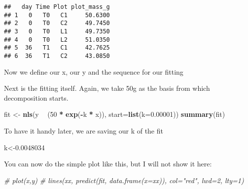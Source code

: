 \documentclass[
]{article}
\newenvironment{Shaded}{\begin{snugshade}}{\end{snugshade}}
\newcommand{\CommentTok}[1]{\textcolor[rgb]{0.56,0.35,0.01}{\textit{#1}}}
\newcommand{\DataTypeTok}[1]{\textcolor[rgb]{0.13,0.29,0.53}{#1}}
\newcommand{\DecValTok}[1]{\textcolor[rgb]{0.00,0.00,0.81}{#1}}
\newcommand{\FloatTok}[1]{\textcolor[rgb]{0.00,0.00,0.81}{#1}}
\newcommand{\KeywordTok}[1]{\textcolor[rgb]{0.13,0.29,0.53}{\textbf{#1}}}
\newcommand{\NormalTok}[1]{#1}
\newcommand{\OperatorTok}[1]{\textcolor[rgb]{0.81,0.36,0.00}{\textbf{#1}}}
\newcommand{\StringTok}[1]{\textcolor[rgb]{0.31,0.60,0.02}{#1}}
\begin{document}
\begin{verbatim}
##   day Time Plot plot_mass_g
## 1   0   T0   C1     50.6300
## 2   0   T0   C2     49.7450
## 3   0   T0   L1     49.7350
## 4   0   T0   L2     51.0350
## 5  36   T1   C1     42.7625
## 6  36   T1   C2     43.0850
\end{verbatim}

Now we define our x, our y and the sequence for our fitting

\begin{Shaded}
\end{Shaded}

Next is the fitting itself. Again, we take 50g as the basis from which
decomposition starts.

\begin{Shaded}
\begin{Highlighting}[]
\NormalTok{fit <-}\StringTok{ }\KeywordTok{nls}\NormalTok{(y }\OperatorTok{~}\StringTok{ }\NormalTok{(}\DecValTok{50} \OperatorTok{*}\StringTok{ }\KeywordTok{exp}\NormalTok{(}\OperatorTok{-}\NormalTok{k }\OperatorTok{*}\StringTok{ }\NormalTok{x)), }\DataTypeTok{start=}\KeywordTok{list}\NormalTok{(}\DataTypeTok{k=}\FloatTok{0.00001}\NormalTok{))}
\KeywordTok{summary}\NormalTok{(fit)}
\end{Highlighting}
\end{Shaded}

To have it handy later, we are saving our k of the fit

\begin{Shaded}
\begin{Highlighting}[]
\NormalTok{k<-}\FloatTok{0.0048034}
\end{Highlighting}
\end{Shaded}

You can now do the simple plot like this, but I will not show it here:

\begin{Shaded}
\begin{Highlighting}[]
\CommentTok{# plot(x,y)}
\CommentTok{# lines(xx, predict(fit, data.frame(x=xx)), col="red", lwd=2, lty=1)}
\end{Highlighting}
\end{Shaded}
\end{document}
